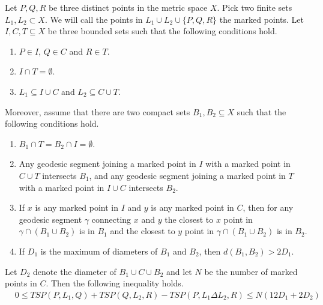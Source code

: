 \begin{lem}\label{comb_argument}
Let $P,Q,R$ be three distinct points in the metric space $X$. Pick two finite sets $L_1, L_2 \subset X$.  We will call the points in  $L_1 \cup L_2 \cup \{P,Q,R\}$ the marked points. Let $I,C,T \subseteq X$ be three bounded sets such that the following conditions hold.
\begin{enumerate}
    \item $P \in I$, $Q \in C$ and $R \in T$.
    \item $ I \cap T =\emptyset $. 
    \item $ L_1 \subseteq I \cup C$ and 
    $ L_2 \subseteq C \cup T$.
    
\end{enumerate}

Moreover, assume that there are two compact sets $B_1, B_2 \subseteq X$  such that the following conditions hold.
\begin{enumerate}
\item $B_1 \cap T= B_2 \cap I= \emptyset$.
 \item Any geodesic segment joining a marked point in $I$ with a marked point in $C \cup T$ intersects $B_1$, and any geodesic segment joining a marked point in  $T$ with a marked point in $I \cup C$ intersects $B_2$.
 \item If $x$ is any marked point in $I$ and $y$ is any marked point in $C$, then for any geodesic segment $\gamma$ connecting $x$ and $y$ the closest to $x$ point in  $\gamma \cap (B_1 \cup B_2)$ is in $B_1$ and the closest to $y$ point in $\gamma \cap (B_1 \cup B_2)$ is in $B_2$.
 \item If $D_1$ is the maximum of diameters of $B_1$ and $B_2$, then $d(B_1,B_2) > 2D_1$.
\end{enumerate}
  Let $D_2$ denote the diameter of $B_1 \cup C \cup B_2$ and let $N$ be the number of marked points in $C$. Then the following inequality holds.
\begin{align*}
    & 0 \leq TSP(P, L_1, Q)+TSP(Q, L_2, R) - TSP(P, L_1 \Delta L_2, R) \leq N(12D_1+2D_2)
\end{align*}

\end{lem}

